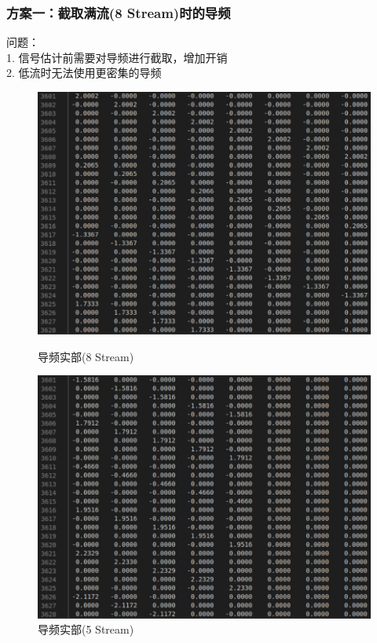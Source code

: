 \documentclass{article}
\begin{document}
\subsubsection{方案一：截取满流(8 Stream)时的导频}
问题：\\
1. 信号估计前需要对导频进行截取，增加开销\\
2. 低流时无法使用更密集的导频\\
\begin{figure}[H]
	\begin{minipage}[t]{0.5\linewidth}
	\centering
	\includegraphics[width = \textwidth]{pilot8.png}
	\caption{导频实部(8 Stream)}
	\end{minipage}
	\begin{minipage}[t]{0.5\linewidth}
	\centering
	\includegraphics[width = \textwidth]{pilot5.png}
	\caption{导频实部(5 Stream)}
	\end{minipage}
\end{figure}
\end{document}
